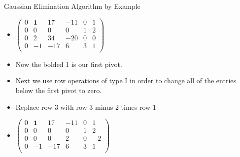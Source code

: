 \documentclass{beamer}
\begin{document}
\begin{frame}{Gaussian Elimination Algorithm by Example}

\begin{itemize}
\item $
\begin{pmatrix}
0 & \textbf{1} &  17    & -11   &  0  &  1  \\
0 &         0  &   0    &   0    &  1  &  2 \\
0 &         2  &  34    &  -20  &  0  &  0 \\
0 &        -1  &  -17   &  6    &  3  &  1 \\
\end{pmatrix}
$
\item Now the bolded 1 is our first pivot.
\item Next we use row operations of type I in order to change all of the
entries below the first pivot to zero.
\item Replace row 3 with row 3 minus 2 times row 1
\item $
\begin{pmatrix}
0 & \textbf{1} &  17   & -11  &  0  &  1  \\
0 &         0  &   0   &  0   &  1  &  2 \\
0 &         0  &   0   &  2   &  0  &  -2 \\
0 &        -1  &  -17   &  6   &  3  &  1 \\
\end{pmatrix}
$
\end{itemize}
\end{frame}

\end{document}
